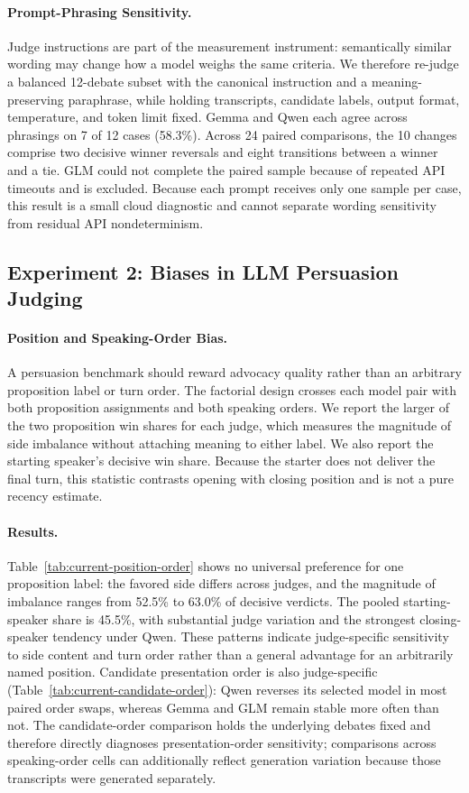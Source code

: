 \documentclass{article}
\begin{document}
\paragraph{Prompt-Phrasing Sensitivity.}
Judge instructions are part of the measurement instrument: semantically similar wording may change how a model weighs the same criteria. We therefore re-judge a balanced 12-debate subset with the canonical instruction and a meaning-preserving paraphrase, while holding transcripts, candidate labels, output format, temperature, and token limit fixed. Gemma and Qwen each agree across phrasings on 7 of 12 cases (58.3\%). Across 24 paired comparisons, the 10 changes comprise two decisive winner reversals and eight transitions between a winner and a tie. GLM could not complete the paired sample because of repeated API timeouts and is excluded. Because each prompt receives only one sample per case, this result is a small cloud diagnostic and cannot separate wording sensitivity from residual API nondeterminism.

\subsection{Experiment 2: Biases in LLM Persuasion Judging}

\paragraph{Position and Speaking-Order Bias.}
A persuasion benchmark should reward advocacy quality rather than an arbitrary proposition label or turn order. The factorial design crosses each model pair with both proposition assignments and both speaking orders. We report the larger of the two proposition win shares for each judge, which measures the magnitude of side imbalance without attaching meaning to either label. We also report the starting speaker's decisive win share. Because the starter does not deliver the final turn, this statistic contrasts opening with closing position and is not a pure recency estimate.

\paragraph{Results.}
Table~\ref{tab:current-position-order} shows no universal preference for one proposition label: the favored side differs across judges, and the magnitude of imbalance ranges from 52.5\% to 63.0\% of decisive verdicts. The pooled starting-speaker share is 45.5\%, with substantial judge variation and the strongest closing-speaker tendency under Qwen. These patterns indicate judge-specific sensitivity to side content and turn order rather than a general advantage for an arbitrarily named position. Candidate presentation order is also judge-specific (Table~\ref{tab:current-candidate-order}): Qwen reverses its selected model in most paired order swaps, whereas Gemma and GLM remain stable more often than not. The candidate-order comparison holds the underlying debates fixed and therefore directly diagnoses presentation-order sensitivity; comparisons across speaking-order cells can additionally reflect generation variation because those transcripts were generated separately.
\end{document}

